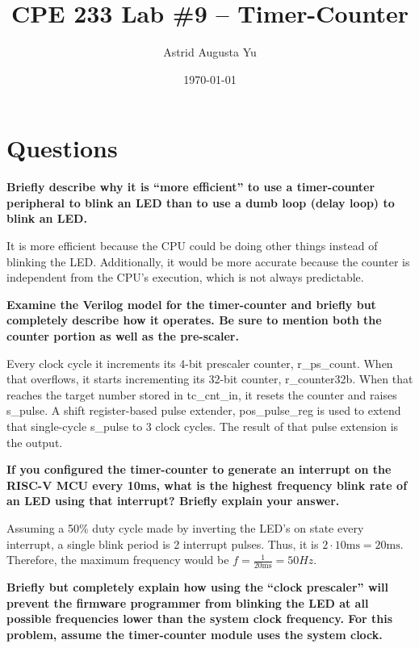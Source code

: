 \documentclass{article}
\author{Astrid Augusta Yu}
\title{CPE 233 Lab \#9 -- Timer-Counter}
\date{\today}
\begin{document}
\maketitle

\tableofcontents

\section{Questions}

\begin{outline}[enumerate]
    \1 \textbf{Briefly describe why it is “more efficient” to use a timer-counter peripheral to blink an LED than to use a dumb loop (delay loop) to blink an LED.   
    }
    
    It is more efficient because the CPU could be doing other things instead of blinking the LED. Additionally, it would be more accurate because the counter is independent from the CPU's execution, which is not always predictable.

    \1 \textbf{Examine the Verilog model for the timer-counter and briefly but completely describe how it operates. Be sure to mention both the counter portion as well as the pre-scaler. } 
    
        \2 Every clock cycle it increments its 4-bit prescaler counter, r\_ps\_count. 
        \2 When that overflows, it starts incrementing its 32-bit counter, r\_counter32b. 
        \2 When that reaches the target number stored in tc\_cnt\_in, it resets the counter and raises s\_pulse. 
        \2 A shift register-based pulse extender, pos\_pulse\_reg is used to extend that single-cycle s\_pulse to 3 clock cycles. The result of that pulse extension is the output.

    \1 \textbf{If you configured the timer-counter to generate an interrupt on the RISC-V MCU every 10ms, what is the highest frequency blink rate of an LED using that interrupt? Briefly explain your answer.}
    
    Assuming a 50\% duty cycle made by inverting the LED's on state every interrupt, a single blink period is 2 interrupt pulses. Thus, it is $2 \cdot 10 \si{\milli\second} = 20 \si{\milli\second}$. Therefore, the maximum frequency would be $f =  \frac{1}{20 \si{\milli\second}} = 50\si{Hz}$. 

    \1 \textbf{Briefly but completely explain how using the “clock prescaler” will prevent the firmware programmer from blinking the LED at all possible frequencies lower than the system clock frequency. For this problem, assume the timer-counter module uses the system clock.  }
    

\end{outline}
\end{document}
